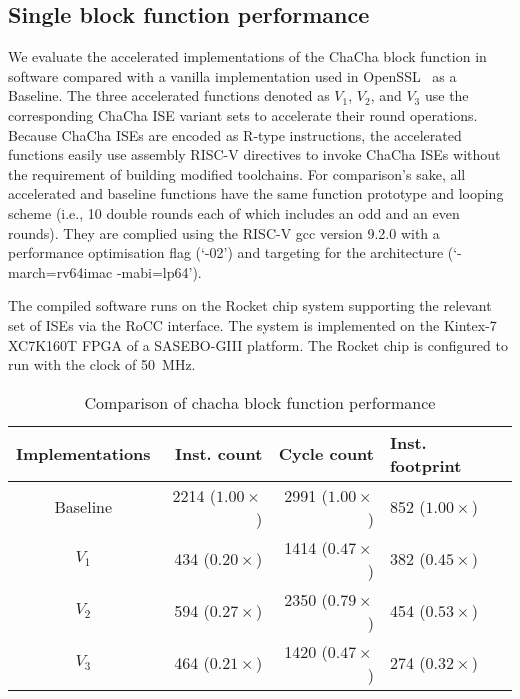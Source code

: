 
\subsection{Single block function performance}
\label{sec:eval:blk}
We evaluate the accelerated implementations of the ChaCha block function in software compared with a vanilla implementation used in OpenSSL~\cite{OpenSSL} as a Baseline. The three accelerated functions denoted as $V_1$, $V_2$, and $V_3$ use the corresponding ChaCha ISE variant sets to accelerate their round operations. 
Because ChaCha ISEs are encoded as R-type instructions, the accelerated functions easily use assembly RISC-V directives  to invoke ChaCha ISEs without the requirement of building modified toolchains.   
For comparison's sake, all accelerated and baseline functions have the same function prototype and looping scheme (i.e., 10 double rounds each of which includes an odd and an even rounds). 
They are complied using the RISC-V gcc version 9.2.0 with a performance optimisation flag (`-02') and targeting for the  architecture (`-march=rv64imac -mabi=lp64'). 

The compiled software runs on the Rocket chip system supporting the relevant set of ISEs via the RoCC interface.
The system is implemented on the Kintex-7 XC7K160T FPGA of a SASEBO-GIII platform.
The Rocket chip is configured to run with the clock of 50~MHz.


\begin{table}[b]
\caption{Comparison of chacha block function performance}
\centering
\label{tab:res:sw:perf1}
\begin{tabular}{crrl}
\toprule            
Implementations        & Inst. count   & Cycle count & Inst. footprint\\

\midrule
Baseline & 2214 ($1.00\times$)     & 2991 ($1.00\times$) &  852 ($1.00\times$)\\
 $V_1$   &  434 ($0.20\times$)     & 1414 ($0.47\times$) &  382 ($0.45\times$)\\
 $V_2$   &  594 ($0.27\times$)     & 2350 ($0.79\times$) &  454 ($0.53\times$)\\
 $V_3$   &  464 ($0.21\times$)     & 1420 ($0.47\times$) &  274 ($0.32\times$)\\

\bottomrule
\end{tabular}
\end{table}

